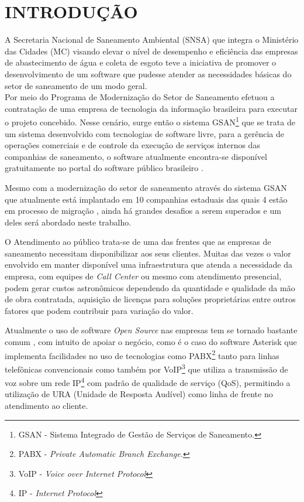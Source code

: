 \chapter[Introdução]{INTRODUÇÃO}

A Secretaria Nacional de Saneamento Ambiental (SNSA) que integra o Ministério das Cidades (MC) visando elevar o nível de desempenho e eficiência das empresas de abastecimento de água e coleta de esgoto teve a iniciativa de promover o desenvolvimento de um software que pudesse atender as necessidades básicas do setor de saneamento de um modo geral. \\[0.2cm]

Por meio do Programa de Modernização do Setor de Saneamento \cite{PMSS:2014} efetuou a contratação de uma empresa de tecnologia da informação brasileira para executar o projeto concebido.  Nesse cenário, surge então o sistema GSAN\footnote{GSAN - Sistema Integrado de Gestão de Serviços de Saneamento.} que se trata de um sistema desenvolvido com tecnologias de software livre, para a gerência de operações comerciais e de controle da execução de serviços internos das companhias de saneamento, o software atualmente encontra-se disponível gratuitamente no portal do software público brasileiro \cite{PORTAL:2014}. 

Mesmo com a modernização do setor de saneamento através do sistema GSAN que atualmente está implantado em 10 companhias estaduais das quais 4 estão em processo de migração \cite{PMSS:2014}, ainda há grandes desafios a serem superados e um deles será abordado neste trabalho.

O Atendimento ao público trata-se de uma das frentes que as empresas de saneamento necessitam disponibilizar aos seus clientes. Muitas das vezes o valor envolvido em manter disponível uma infraestrutura que atenda a necessidade da empresa, com equipes de \textit{Call Center} ou mesmo com atendimento presencial, podem gerar custos astronômicos dependendo da quantidade e qualidade da mão de obra contratada, aquisição de licenças para soluções proprietárias entre outros fatores que podem contribuir para variação do valor. 

Atualmente o uso de software \textit{Open Source} nas empresas tem se tornado bastante comum \cite{MEIRELLES2014}, com intuito de apoiar o negócio, como é o caso do software Asterisk que implementa facilidades no uso de tecnologias como PABX\footnote{PABX - \textit{Private Automatic Branch Exchange.}}  tanto para linhas telefônicas convencionais como também por VoIP\footnote{VoIP - \textit{Voice over Internet Protocol}} que utiliza a transmissão de voz sobre um rede IP\footnote{IP - \textit{Internet Protocol}} com padrão de qualidade de serviço (QoS), permitindo a utilização de URA (Unidade de Resposta Audível) \cite{VIEIRA:2007} como linha de frente no atendimento ao cliente.


